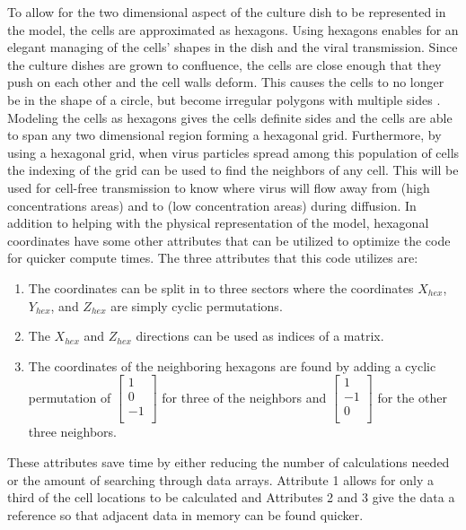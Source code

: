To allow for the two dimensional aspect of the culture dish to be represented in the model, the cells are approximated as hexagons. Using hexagons enables for an elegant managing of the cells' shapes in the dish and the viral transmission. Since the culture dishes are grown to confluence, the cells are close enough that they push on each other and the cell walls deform. This causes the cells to no longer be in the shape of a circle, but become irregular polygons with multiple sides \citep{bruckner_importance_2018}. Modeling the cells as hexagons gives the cells definite sides and the cells are able to span any two dimensional region forming a hexagonal grid. Furthermore, by using a hexagonal grid, when virus particles spread among this population of cells the indexing of the grid can be used to find the neighbors of any cell. This will be used for cell-free transmission to know where virus will flow away from (high concentrations areas) and to (low concentration areas) during diffusion. In addition to helping with the physical representation of the model, hexagonal coordinates have some other attributes that can be utilized to optimize the code for quicker compute times. The three attributes that this code utilizes are:
\begin{enumerate} 
    \item The coordinates can be split in to three sectors where the coordinates $X_{hex}$, $Y_{hex}$, and $Z_{hex}$ are simply cyclic permutations.
    \item The $X_{hex}$ and $Z_{hex}$ directions can be used as indices of a matrix.
    \item The coordinates of the neighboring hexagons are found by adding a cyclic permutation of 
        $\left [
            \begin{array}{c}
                1 \\
                0 \\
                -1\\
            \end{array}
        \right ]$
        for three of the neighbors and
        $\left [ 
            \begin{array}{c}
                1 \\
                -1 \\
                0\\
            \end{array}
        \right ]$
        for the other three neighbors.
\end{enumerate}
These attributes save time by either reducing the number of calculations needed or the amount of searching through data arrays. Attribute 1 allows for only a third of the cell locations to be calculated and Attributes 2 and 3 give the data a reference so that adjacent data in memory can be found quicker.

